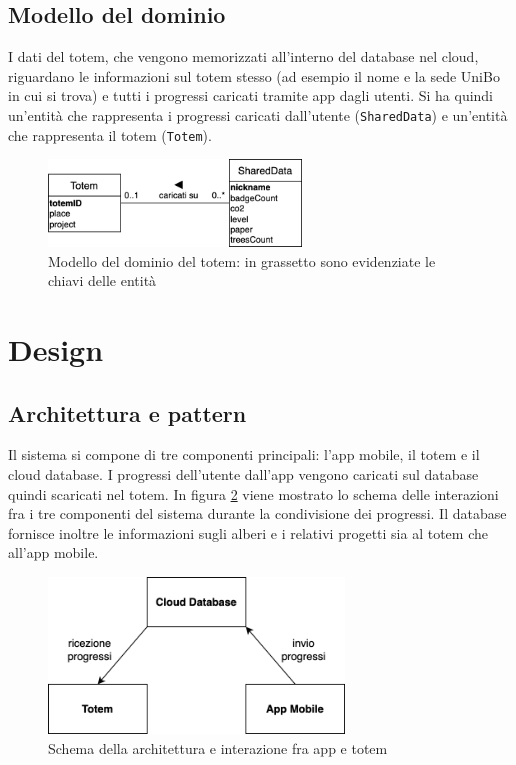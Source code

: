 \subsection{Modello del dominio}
I dati del totem, che vengono memorizzati all'interno del database nel cloud, riguardano le informazioni sul totem stesso (ad esempio il nome e la sede UniBo in cui si trova) e tutti i progressi caricati tramite app dagli utenti.
Si ha quindi un'entità che rappresenta i progressi caricati dall'utente (\texttt{SharedData}) e un'entità che rappresenta il totem (\texttt{Totem}).
\begin{figure}[h!]
    \centering
    \includegraphics[width=0.6\textwidth]{img/totem/totemDomain.png}
    \caption[Modello del dominio del totem]{Modello del dominio del totem: in grassetto sono evidenziate le chiavi delle entità}
    \label{fig:totemDomain}
\end{figure}
%
%
%
%
\section{Design}
\subsection{Architettura e pattern}
Il sistema si compone di tre componenti principali: l'app mobile, il totem e il cloud database. I progressi dell'utente dall'app vengono caricati sul database quindi scaricati nel totem. In figura \ref{fig:communication-schema} viene mostrato lo schema delle interazioni fra i tre componenti del sistema durante la condivisione dei progressi.
Il database fornisce inoltre le informazioni sugli alberi e i relativi progetti sia al totem che all'app mobile.
\begin{figure} [h]
    \centering
    \includegraphics[width=0.7\textwidth]{img/arch-totem-app-dati.png}
    \caption{Schema della architettura e interazione fra app e totem}
    \label{fig:communication-schema}
\end{figure}

